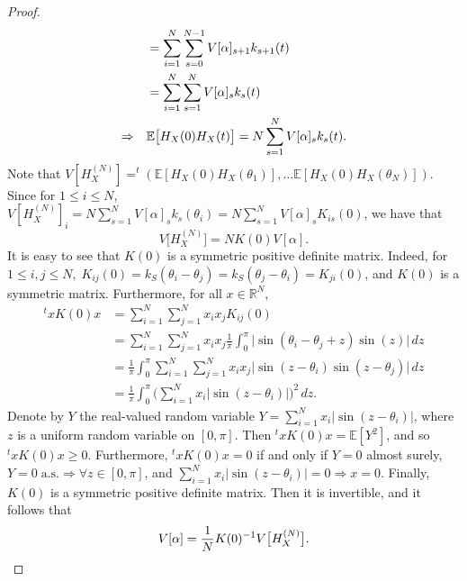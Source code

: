 \documentclass[numbers,compress,v1.0.1]{vmsta}
\theoremstyle{definition}
\begin{document}
\begin{proof}
\begin{align}
&\quad =\sum_{i=1}^N\sum_{s=0}^{N-1} V[\alpha]_{s+1}k_{s+1}(t)\notag\\
&\quad =\sum_{i=1}^N\sum_{s=1}^{N} V[\alpha]_{s}k_{s}(t)\notag\\
\Rightarrow&\quad \mathbb{E}\bigl[ H_{X}(0) H_{X}(t)\bigr]=N\sum_{s=1}^{N} V[\alpha ]_{s}k_{s}(t). \label{eq:lienHHtoalpha}
\end{align}
%
Note that $V[H_X^{(N)}]=^t(\mathbb{E}[ H_{X}(0) H_{X}(\theta_1)],\ldots
\mathbb{E}[ H_{X}(0) H_{X}(\theta_N)])$. Since for $1\leq i\leq N$,
$V[H_X^{(N)}]_i= N\sum_{s=1}^{N} V[\alpha]_{s} k_{s}(\theta_i)=N\sum_{s=1}^{N} V[\alpha]_{s} K_{is}(0)$, we have that
%
\begin{equation}
V\bigl[H_X^{(N)}\bigr]=N K(0)V[\alpha]. \label{eq: matricielCHetV}
\end{equation}
%
It is easy to see that $K(0)$ is a symmetric positive definite matrix. Indeed,
for $1\leq i,j\leq N,\; K_{ij}(0)=k_S(\theta_i-\theta_j)=k_S(\theta
_j-\theta_i)=K_{ji}(0)$, and  $K(0)$ is a symmetric matrix.
Furthermore, for all $x\in\mathbb{R}^N$,
%
\begin{align*}
^t xK(0)x &=\sum_{i=1}^N\sum
_{j=1}^N x_i x_j
K_{ij}(0)
\\
&=\sum_{i=1}^N\sum
_{j=1}^N x_i x_j
\frac{1}{\pi}\int_0^\pi\bigl\vert\sin (
\theta_i-\theta_j+z)\sin(z)\bigr\vert \,dz
\\
&= \frac{1}{\pi}\int_0^\pi\sum
_{i=1}^N\sum_{j=1}^N
x_i x_j \bigl\vert\sin (z-\theta_i)\sin(z-
\theta_j)\bigr\vert \,dz
\\
&= \frac{1}{\pi}\int_0^\pi\Biggl(\sum
_{i=1}^N x_i\bigl\vert\sin(z-
\theta_i)\bigr\vert \Biggr)^2 \,dz.
\end{align*}
%
Denote by $Y$ the real-valued random variable
$Y=\sum_{i=1}^N x_i\vert\sin(z-\theta_i)\vert$, where $z$ is a uniform
random variable on $[0,\pi]$. Then $ ^t xK(0)x =\mathbb{E}[Y^2]$, and
so $ ^t xK(0)x \geq0$. Furthermore, $ ^t xK(0)x =0$ if and only if
$Y=0$ almost surely, $Y=0\; \text{a.s.}\Rightarrow\forall z\in[0,\pi
]$, and $\sum_{i=1}^N x_i\vert\sin(z-\theta_i)\vert=0\Rightarrow x=0
$. Finally, $K(0)$ is a symmetric positive definite matrix. Then it is
invertible, and it follows that
%
\begin{equation*}
V[\alpha]=\frac{1}{N}K(0)^{-1} V\bigl[H_X^{(N)}
\bigr].\qedhere
\end{equation*}
%
\end{proof}
\end{document}
